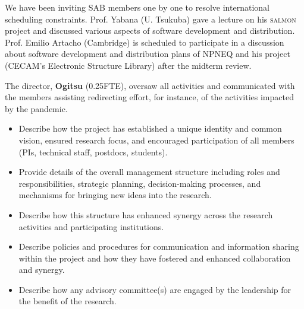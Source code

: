 We have been inviting SAB members one by one to resolve international scheduling constraints. 
Prof. Yabana (U. Tsukuba)  gave a lecture on his \textsc{salmon} project and discussed various aspects of software development and distribution. 
Prof. Emilio Artacho (Cambridge) is scheduled to participate in a discussion about software development and distribution plans of NPNEQ and his project (CECAM's Electronic Structure Library) after the midterm review.

The director, {\bf Ogitsu} (0.25FTE), oversaw all activities and communicated with the members assisting redirecting effort, for instance, of the activities impacted by the pandemic.

{\small\color{red}
\begin{itemize}
    \item Describe how the project has established a unique identity and common vision, ensured research focus, and encouraged participation of all members (PIs, technical staff, postdocs, students).
    \item Provide details of the overall management structure including roles and responsibilities, strategic planning, decision-making processes, and mechanisms for bringing new ideas into the research.
    \item Describe how this structure has enhanced synergy across the research activities and participating institutions.
    \item Describe policies and procedures for communication and information sharing within the project and how they have fostered and enhanced collaboration and synergy.
    \item Describe how any advisory committee(s) are engaged by the leadership for the benefit of the research.
    
\end{itemize}
}

\clearpage

